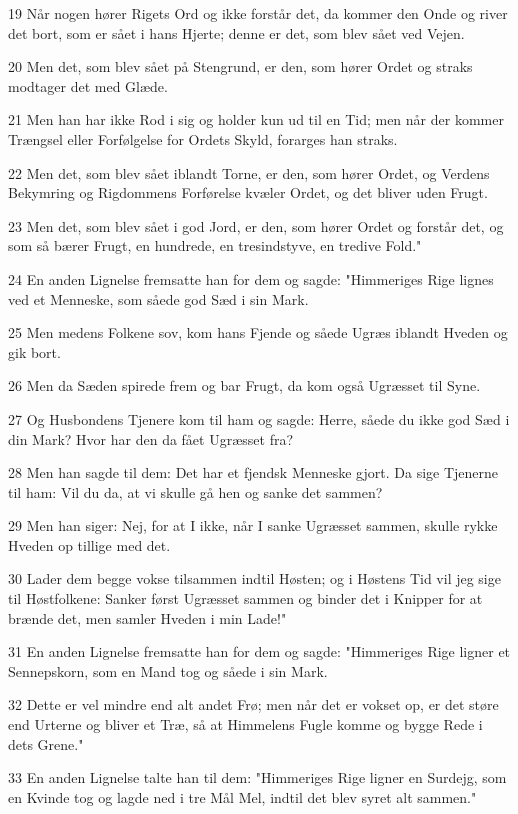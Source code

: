 \par 19 Når nogen hører Rigets Ord og ikke forstår det, da kommer den Onde og river det bort, som er sået i hans Hjerte; denne er det, som blev sået ved Vejen.
\par 20 Men det, som blev sået på Stengrund, er den, som hører Ordet og straks modtager det med Glæde.
\par 21 Men han har ikke Rod i sig og holder kun ud til en Tid; men når der kommer Trængsel eller Forfølgelse for Ordets Skyld, forarges han straks.
\par 22 Men det, som blev sået iblandt Torne, er den, som hører Ordet, og Verdens Bekymring og Rigdommens Forførelse kvæler Ordet, og det bliver uden Frugt.
\par 23 Men det, som blev sået i god Jord, er den, som hører Ordet og forstår det, og som så bærer Frugt, en hundrede, en tresindstyve, en tredive Fold."
\par 24 En anden Lignelse fremsatte han for dem og sagde: "Himmeriges Rige lignes ved et Menneske, som såede god Sæd i sin Mark.
\par 25 Men medens Folkene sov, kom hans Fjende og såede Ugræs iblandt Hveden og gik bort.
\par 26 Men da Sæden spirede frem og bar Frugt, da kom også Ugræsset til Syne.
\par 27 Og Husbondens Tjenere kom til ham og sagde: Herre, såede du ikke god Sæd i din Mark? Hvor har den da fået Ugræsset fra?
\par 28 Men han sagde til dem: Det har et fjendsk Menneske gjort. Da sige Tjenerne til ham: Vil du da, at vi skulle gå hen og sanke det sammen?
\par 29 Men han siger: Nej, for at I ikke, når I sanke Ugræsset sammen, skulle rykke Hveden op tillige med det.
\par 30 Lader dem begge vokse tilsammen indtil Høsten; og i Høstens Tid vil jeg sige til Høstfolkene: Sanker først Ugræsset sammen og binder det i Knipper for at brænde det, men samler Hveden i min Lade!"
\par 31 En anden Lignelse fremsatte han for dem og sagde: "Himmeriges Rige ligner et Sennepskorn, som en Mand tog og såede i sin Mark.
\par 32 Dette er vel mindre end alt andet Frø; men når det er vokset op, er det støre end Urterne og bliver et Træ, så at Himmelens Fugle komme og bygge Rede i dets Grene."
\par 33 En anden Lignelse talte han til dem: "Himmeriges Rige ligner en Surdejg, som en Kvinde tog og lagde ned i tre Mål Mel, indtil det blev syret alt sammen."
